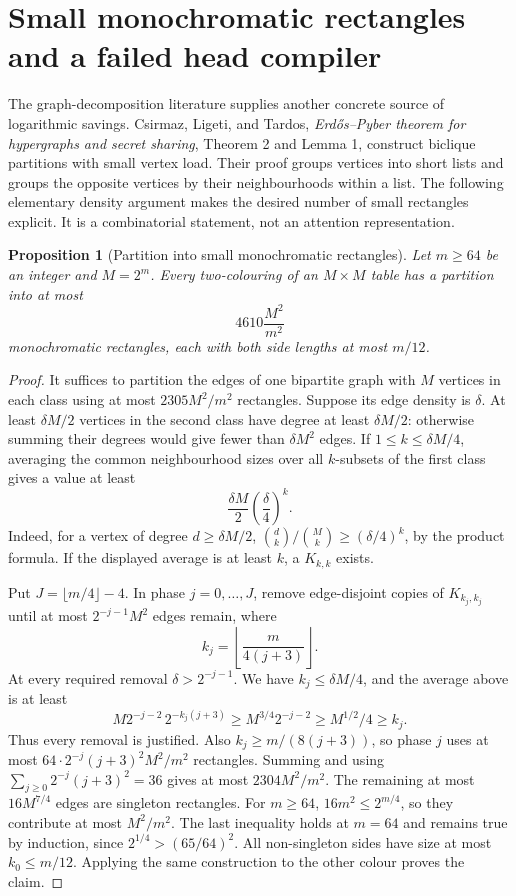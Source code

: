 \documentclass[11pt]{article}
\newtheorem{proposition}{Proposition}
\begin{document}
\section{Small monochromatic rectangles and a failed head compiler}

The graph-decomposition literature supplies another concrete source of
logarithmic savings. Csirmaz, Ligeti, and Tardos, \emph{Erd\H{o}s--Pyber
theorem for hypergraphs and secret sharing}, Theorem 2 and Lemma 1,
construct biclique partitions with small vertex load. Their proof groups
vertices into short lists and groups the opposite vertices by their
neighbourhoods within a list. The following elementary density argument
makes the desired number of small rectangles explicit. It is a
combinatorial statement, not an attention representation.

\begin{proposition}[Partition into small monochromatic rectangles]
Let $m\ge64$ be an integer and $M=2^m$. Every two-colouring of an
$M\times M$ table has a partition into at most
\[
 4610\frac{M^2}{m^2}
\]
monochromatic rectangles, each with both side lengths at most $m/12$.
\end{proposition}
\begin{proof}
It suffices to partition the edges of one bipartite graph with $M$
vertices in each class using at most $2305M^2/m^2$ rectangles.
Suppose its edge density is $\delta$. At least $\delta M/2$ vertices
in the second class have degree at least $\delta M/2$: otherwise
summing their degrees would give fewer than $\delta M^2$ edges.
If $1\le k\le\delta M/4$, averaging the common neighbourhood sizes
over all $k$-subsets of the first class gives a value at least
\[
 \frac{\delta M}{2}\left(\frac{\delta}{4}\right)^k.
\]
Indeed, for a vertex of degree $d\ge\delta M/2$,
$\binom d k/\binom M k\ge(\delta/4)^k$, by the product formula.
If the displayed average is at least $k$, a $K_{k,k}$ exists.

Put $J=\lfloor m/4\rfloor-4$. In phase $j=0,\ldots,J$, remove
edge-disjoint copies of $K_{k_j,k_j}$ until at most
$2^{-j-1}M^2$ edges remain, where
\[
 k_j=\left\lfloor\frac{m}{4(j+3)}\right\rfloor.
\]
At every required removal $\delta>2^{-j-1}$. We have
$k_j\le\delta M/4$, and the average above is at least
\[
 M2^{-j-2}\,2^{-k_j(j+3)}
 \ge M^{3/4}2^{-j-2}\ge M^{1/2}/4\ge k_j.
\]
Thus every removal is justified. Also
$k_j\ge m/(8(j+3))$, so phase $j$ uses at most
$64\cdot2^{-j}(j+3)^2M^2/m^2$ rectangles. Summing and using
$\sum_{j\ge0}2^{-j}(j+3)^2=36$ gives at most $2304M^2/m^2$.
The remaining at most $16M^{7/4}$ edges are singleton rectangles.
For $m\ge64$, $16m^2\le2^{m/4}$, so they contribute at most
$M^2/m^2$. The last inequality holds at $m=64$ and remains true
by induction, since $2^{1/4}>(65/64)^2$.
All non-singleton sides have size at most $k_0\le m/12$.
Applying the same construction to the other colour proves the claim.
\end{proof}
\end{document}
